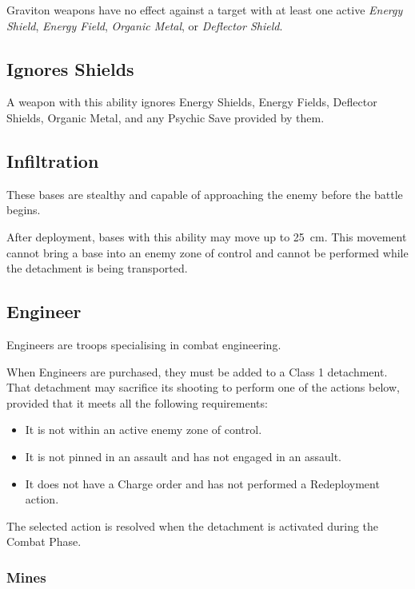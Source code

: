 Graviton weapons have no effect against a target with at least one active \textit{Energy Shield}, \textit{Energy Field}, \textit{Organic Metal}, or \textit{Deflector Shield}.

\subsection{Ignores Shields}

A weapon with this ability ignores Energy Shields, Energy Fields, Deflector Shields, Organic Metal, and any Psychic Save provided by them.

\subsection{Infiltration}

These bases are stealthy and capable of approaching the enemy before the battle begins.

After deployment, bases with this ability may move up to 25~cm. This movement cannot bring a base into an enemy zone of control and cannot be performed while the detachment is being transported.

\subsection{Engineer}

Engineers are troops specialising in combat engineering.

When Engineers are purchased, they must be added to a Class 1 detachment. That detachment may sacrifice its shooting to perform one of the actions below, provided that it meets all the following requirements:

\begin{itemize}
    \item It is not within an active enemy zone of control.
    \item It is not pinned in an assault and has not engaged in an assault.
    \item It does not have a Charge order and has not performed a Redeployment action.
\end{itemize}

The selected action is resolved when the detachment is activated during the Combat Phase.

\subsubsection{Mines}


